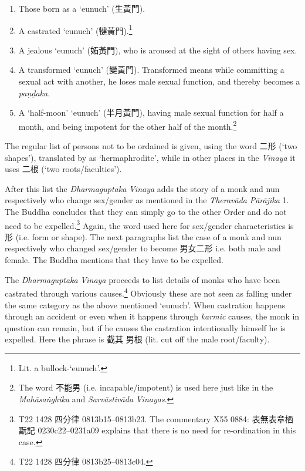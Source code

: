 \begin{enumerate}
\item Those born as a `eunuch' (生黃門). 
\item A castrated `eunuch' (犍黃門).\footnote{Lit. a bullock-`eunuch'.}
\item A jealous `eunuch' (妬黃門), who is aroused at the sight of others having sex.
\item A transformed `eunuch' (變黃門). Transformed means while committing a sexual act with another, he loses male sexual function, and thereby becomes a \textit{paṇḍaka}.
\item A `half-moon' `eunuch' (半月黃門), having male sexual function for half a month, and being impotent for the other half of the month.\footnote{The word 不能男 (i.e. incapable/impotent) is used here just like in the \textit{Mahāsaṅghika} and \textit{Sarvāstivāda} \textit{Vinayas}.}
\end{enumerate}

The regular list of persons not to be ordained is given, using the word 二形 (`two shapes'), translated by \cite{bodhi} as `hermaphrodite', while in other places in the \textit{Vinaya} it uses 二根 (`two roots/faculties'). 

After this list the \textit{Dharmaguptaka} \textit{Vinaya} adds the story of a monk and nun respectively who change sex/gender as mentioned in the \textit{Theravāda} \textit{Pārājika} 1. The Buddha concludes that they can simply go to the other Order and do not need to be expelled.\footnote{T22 1428 四分律 0813b15–0813b23. The commentary X55 0884: 表無表章栖翫記 0230c22–0231a09 explains that there is no need for re-ordination in this case.} Again, the word used here for sex/gender characteristics is 形 (i.e. form or shape). The next paragraphs list the case of a monk and nun respectively who changed sex/gender to become 男女二形 i.e. both male and female. The Buddha mentions that they have to be expelled.

The \textit{Dharmaguptaka} \textit{Vinaya} proceeds to list details of monks who have been castrated through various causes.\footnote{T22 1428 四分律 0813b25–0813c04.} Obviously these are not seen as falling under the same category as the above mentioned `eunuch'. When castration happens through an accident or even when it happens through \textit{karmic} causes, the monk in question can remain, but if he causes the castration intentionally himself he is expelled. Here the phrase is 截其 男根 (lit. cut off the male root/faculty).

